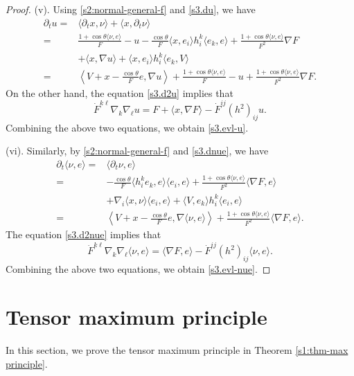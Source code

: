 \documentclass[11pt,reqno]{amsart}
\theoremstyle{definition}
\theoremstyle{remark}
\numberwithin{equation}{section}
\renewcommand{\(}{\left(}
\renewcommand{\)}{\right)}
\renewcommand{\-}{\overline}
\begin{document}
\begin{proof}
(v). Using \eqref{s2:normal-general-f} and \eqref{s3.du}, we have
\begin{align*}
  \partial_tu= & \langle \partial_tx,\nu\rangle+\langle x,\partial_t \nu\rangle\\
  = & \frac{1+\cos\theta\langle \nu,e\rangle}{F}-u-\frac{\cos\theta}{F}\langle x,e_i\rangle h_i^k\langle e_k,e\rangle+\frac{1+\cos\theta\langle \nu,e\rangle}{F^2}\nabla F\\
  &+\langle x,\nabla u\rangle +\langle x,e_i\rangle h_i^k\langle e_k,V\rangle\\
  =&\left\langle V+x-\frac{\cos\theta}{F}e,\nabla u\right\rangle+\frac{1+\cos\theta\langle \nu,e\rangle}{F}-u+\frac{1+\cos\theta\langle \nu,e\rangle}{F^2}\nabla F.
\end{align*}
On the other hand, the equation \eqref{s3.d2u} implies that
\begin{equation*}
  \dot{F}^{k\ell}\nabla_k\nabla_\ell u=F+\langle x,\nabla F\rangle -\dot{F}^{ij}(h^2)_{ij}u.
\end{equation*}
Combining the above two equations, we obtain \eqref{s3.evl-u}.

(vi). Similarly, by \eqref{s2:normal-general-f} and \eqref{s3.dnue}, we have
\begin{align*}
  \partial_t\langle \nu,e\rangle= & \langle \partial_t \nu,e\rangle \\
  = &-\frac{\cos\theta}{F}\langle h_i^ke_k,e\rangle\langle e_i,e\rangle + \frac{1+\cos\theta\langle \nu,e\rangle}{F^2}\langle\nabla F,e\rangle\\
  &+\nabla_i\langle x,\nu\rangle \langle e_i,e\rangle+\langle V,e_k\rangle h_i^k\langle e_i,e\rangle \\
  =&\left\langle V+x-\frac{\cos\theta}{F}e,\nabla \langle \nu,e\rangle\right\rangle+ \frac{1+\cos\theta\langle \nu,e\rangle}{F^2}\langle\nabla F,e\rangle.
\end{align*}
The equation \eqref{s3.d2nue} implies that
\begin{equation*}
  \dot{F}^{k\ell}\nabla_k\nabla_\ell \langle \nu,e\rangle=\langle \nabla F,e\rangle -\dot{F}^{ij}(h^2)_{ij}\langle \nu,e\rangle.
\end{equation*}
Combining the above two equations, we obtain \eqref{s3.evl-nue}.
\end{proof}


\section{Tensor maximum principle}\label{sec:4}
In this section, we prove the tensor maximum principle in Theorem \ref{s1:thm-max principle}.
\end{document}
